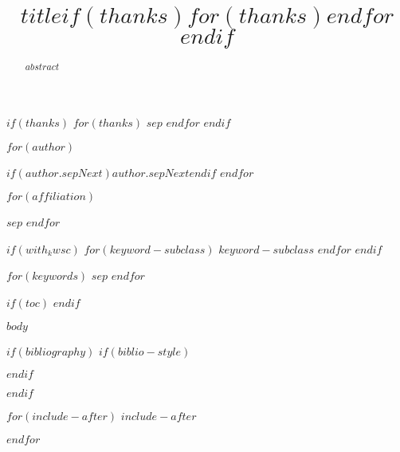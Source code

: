 \documentclass[$journal$]{imsart}
\numberwithin{equation}{section}
\theoremstyle{plain}
\theoremstyle{remark}
\begin{document}
\begin{frontmatter}
\title{$title$$if(thanks)$$for(thanks)$$endfor$$endif$}

$if(thanks)$
$for(thanks)$
$sep$
$endfor$
$endif$


\begin{aug}


$for(author)$
\author[$author.addressLabel$]{ 
  }
  $if(author.sepNext)$$author.sepNext$$endif$
$endfor$

$for(affiliation)$
\address[$affiliation.label$]{$affiliation.name$,
  }
$sep$
$endfor$
\end{aug}

\begin{abstract}
$abstract$
\end{abstract}

$if(with_kwsc)$
$for(keyword-subclass)$
$keyword-subclass$
$endfor$
$endif$

\begin{keyword}
$for(keywords)$
$sep$
$endfor$
\end{keyword}

\end{frontmatter}

$if(toc)$
\tableofcontents
$endif$

$body$

$if(bibliography)$
$if(biblio-style)$

$endif$

$endif$

$for(include-after)$
$include-after$

$endfor$
\end{document}
